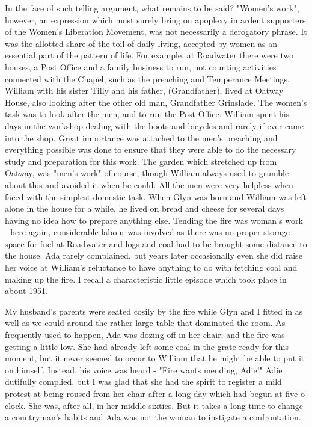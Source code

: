 In the face of such telling argument, what remains to be said? "Women's work", however, an expression which must surely bring on apoplexy in ardent supporters of the Women's Liberation Movement, was not necessarily a derogatory phrase. It was the allotted share of the toil of daily living, accepted by women as an essential part of the pattern of life. For example, at Roadwater there were two houses, a Post Office and a family business to run, not counting activities connected with the Chapel, such as the preaching and Temperance Meetings. William with his sister Tilly and his father, (Grandfather), lived at Oatway House, also looking after the other old man, Grandfather Grinslade. The women's task was to look after the men, and to run the Post Office. William spent his days in the workshop dealing with the boots and bicycles and rarely if ever came into the shop. Great importance was attached to the men's preaching and everything possible was done to ensure that they were able to do the necessary study and preparation for this work. The garden which stretched up from Oatway, was "men's work" of course, though William always used to grumble about this and avoided it when he could. All the men were very helpless when faced with the simplest domestic task. When Glyn was born and William was left alone in the house for a while, he lived on bread and cheese for several days having no idea how to prepare anything else. Tending the fire was woman's work - here again, considerable labour was involved as there was no proper storage space for fuel at Roadwater and logs and coal had to be brought some distance to the house. Ada rarely complained, but years later occasionally even she did raise her voice at William's reluctance to have anything to do with fetching coal and making up the fire. I recall a characteristic little episode which took place in about 1951.

My husband's parents were seated cosily by the fire while Glyn and I fitted in as well as we could around the rather large table that dominated the room. As frequently used to happen, Ada was dozing off in her chair; and the fire was getting a little low. She had already left some coal in the grate ready for this moment, but it never seemed to occur to William that he might be able to put it on himself. Instead, his voice was heard - "Fire wants mending, Adie!" Adie dutifully complied, but I was glad that she had the spirit to register a mild protest at being roused from her chair after a long day which had begun at five o-clock. She was, after all, in her middle sixties. But it takes a long time to change a countryman's habits and Ada was not the woman to instigate a confrontation.

